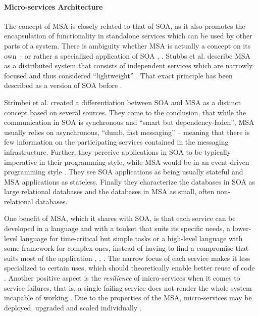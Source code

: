 
\paragraph{Micro-services Architecture} %
\label{par:micro_services_architecture}
The concept of \ac{MSA} is closely related to that of \ac{SOA}, as it also promotes the encapsulation of functionality in standalone services which can be used by other parts of a system. There is ambiguity whether \ac{MSA} is actually a concept on its own -- or rather a specialized application of \ac{SOA} \cite[p.~35]{Stubbs2015Distributed}, \cite[p.~17]{Strimbei2015Software}.
Stubbs et al. describe \ac{MSA} as a distributed system that consists of independent services which are   narrowly focused and thus considered ``lightweight'' \cite[p.~35]{Stubbs2015Distributed}.
That exact principle has been described as a version of \ac{SOA} before \cite[p.~395]{Papazoglou2007Service}.

Strîmbei et al. created a differentiation between SOA and MSA as a distinct concept based on several sources. They come to the conclusion, that while the communication in \ac{SOA} is synchronous and ``smart but dependency-laden'', \ac{MSA} usually relies on asynchronous, ``dumb, fast messaging'' -- meaning that there is few information on the participating services contained in the messaging infrastructure. Further, they perceive applications in \ac{SOA} to be typically imperative in their programming style, while \ac{MSA} would be in an event-driven programming style \cite[pp.~17-20]{Strimbei2015Software}. They see \ac{SOA} applications as being usually stateful and \ac{MSA} applications as stateless. Finally they characterize the databases in \ac{SOA} as large relational databases and the databases in \ac{MSA} as small, often non-relational databases.

One benefit of \ac{MSA}, which it shares with \ac{SOA}, is that each service can be developed in a language and with a toolset that suits its specific needs, \eg a lower-level language for time-critical but simple tasks or a high-level language with some framework for complex ones, instead of having to find a compromise that suits most of the application  \cite[p.~35]{Stubbs2015Distributed}, \cite[p.~4]{Newman2015Building}, \cite[p.~113]{Thones2015Microservices}.
The narrow focus of each service makes it less specialized to certain uses, which should theoretically enable better reuse of code \cite[p.~35]{Stubbs2015Distributed}.
Another positive aspect is the \emph{resilience} of micro-services when it comes to service failures, that is, a single failing service does not render the whole system incapable of working \cite[p.~5]{Newman2015Building}.
Due to the properties of the \ac{MSA}, micro-services may be deployed, upgraded and scaled individually \cite[p.~116]{Thones2015Microservices}.

